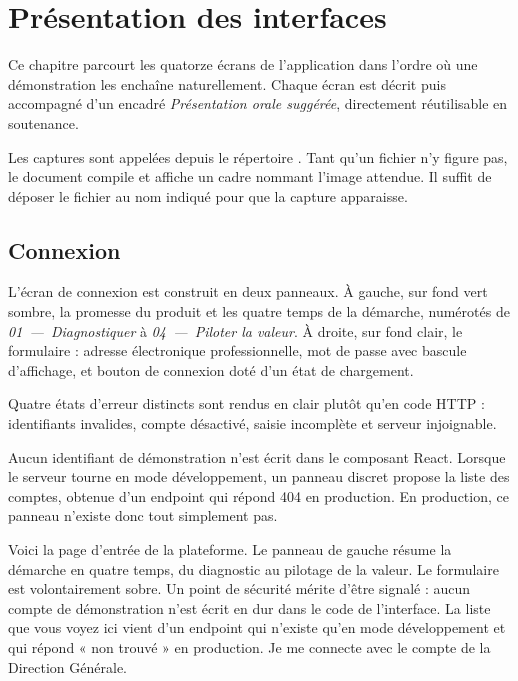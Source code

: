 \chapter{Présentation des interfaces}
\label{chap:interfaces}

Ce chapitre parcourt les quatorze écrans de l'application dans l'ordre où une
démonstration les enchaîne naturellement. Chaque écran est décrit puis accompagné d'un
encadré \emph{Présentation orale suggérée}, directement réutilisable en soutenance.

\begin{remarque}
Les captures sont appelées depuis le répertoire . Tant qu'un
fichier n'y figure pas, le document compile et affiche un cadre nommant l'image
attendue. Il suffit de déposer le fichier au nom indiqué pour que la capture apparaisse.
\end{remarque}

\section{Connexion}

L'écran de connexion est construit en deux panneaux. À gauche, sur fond vert sombre, la
promesse du produit et les quatre temps de la démarche, numérotés de
\emph{01~—~Diagnostiquer} à \emph{04~—~Piloter la valeur}. À droite, sur fond clair, le
formulaire : adresse électronique professionnelle, mot de passe avec bascule
d'affichage, et bouton de connexion doté d'un état de chargement.

Quatre états d'erreur distincts sont rendus en clair plutôt qu'en code HTTP :
identifiants invalides, compte désactivé, saisie incomplète et serveur injoignable.

Aucun identifiant de démonstration n'est écrit dans le composant React. Lorsque le
serveur tourne en mode développement, un panneau discret propose la liste des comptes,
obtenue d'un endpoint qui répond 404 en production. En production, ce panneau n'existe
donc tout simplement pas.


\begin{oral}
Voici la page d'entrée de la plateforme. Le panneau de gauche résume la démarche en
quatre temps, du diagnostic au pilotage de la valeur. Le formulaire est volontairement
sobre. Un point de sécurité mérite d'être signalé : aucun compte de démonstration n'est
écrit en dur dans le code de l'interface. La liste que vous voyez ici vient d'un
endpoint qui n'existe qu'en mode développement et qui répond « non trouvé » en
production. Je me connecte avec le compte de la Direction Générale.
\end{oral}

